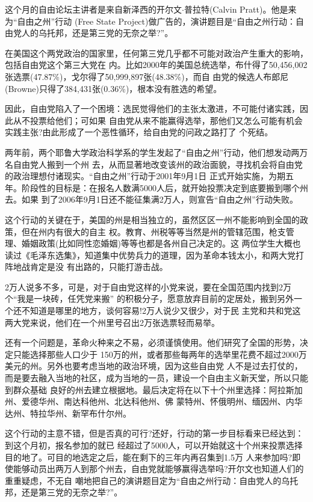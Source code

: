 ﻿\documentclass[11pt]{article}
\begin{document}
这个月的自由论坛主讲者是来自新泽西的开尔文$\cdot$普拉特(Calvin Pratt)。他是来为``自由之州''行动
(Free State Project)做广告的，演讲题目是``自由之州行动：自由党人的乌托邦，还是第三党的无奈之举?''。

在美国这个两党政治的国家里，任何第三党几乎都不可能对政治产生重大的影响，包括自由党这个第三大党在
内。比如2000年的美国总统选举，布什得了50,456,002张选票(47.87\%)，戈尔得了50,999,897张(48.38\%)，而自
由党的候选人布郎尼(Browne)只得了384,431张(0.36\%)，根本没有胜选的希望。

因此，自由党陷入了一个困境：选民觉得他们的主张太激进，不可能付诸实践，因此从不投票给他们；可如果
自由党从来不能赢得选举，那他们又怎么可能有机会实践主张?由此形成了一个恶性循环，给自由党的问政之路打了
个死结。

两年前，两个耶鲁大学政治科学系的学生发起了``自由之州''行动，他们想发动两万名自由党人搬到一个州
去，从而显著地改变该州的政治面貌，寻找机会将自由党的政治理想付诸现实。``自由之州''行动于2001年9月1日
正式开始实施，为期五年。阶段性的目标是：在报名人数满5000人后，就开始投票决定到底要搬到哪个州去。如果
到了2006年9月1日还不能征集满2万人，则宣告``自由之州''行动失败。

这个行动的关键在于，美国的州是相当独立的，虽然区区一州不能影响到全国的政策，但在州内有很大的自主
权。教育、州税等等当然是州的管辖范围，枪支管理、婚姻政策(比如同性恋婚姻)等等也都是各州自己决定的。这
两位学生大概也读过《毛泽东选集》，知道集中优势兵力的道理，因为革命本钱太小，和两大党打阵地战肯定是没
有出路的，只能打游击战。

2万人说多不多，可是，对于自由党这样的小党来说，要在全国范围内找到2万个``我是一块砖，任凭党来搬''
的积极分子，愿意放弃目前的定居处，搬到另外一个还不知道是哪里的地方，谈何容易!2万人说少又很少，对于民
主党和共和党这两大党来说，他们在一个州里号召出2万张选票轻而易举。

还有一个问题是，革命火种来之不易，必须谨慎使用。他们研究了全国的形势，决定只能选择那些人口少于
150万的州，或者那些每两年的选举里花费不超过2000万美元的州。另外也要考虑当地的政治环境，因为这些自由党
人不是过去打仗的，而是要去融入当地的社区，成为当地的一员，建设一个自由主义新天堂，所以只能到群众基础
良好的州去建立根据地。最后决定将在以下十个州里选择：阿拉斯加州、爱德华州、南达科他州、北达科他州、佛
蒙特州、怀俄明州、缅因州、内华达州、特拉华州、新罕布什尔州。

这个行动的主意不错，但是否真的可行?还好，行动的第一步目标看来已经达到：到这个月初，报名参加的就已
经超过了5000人，可以开始就这十个州来投票选择目的地了。可目的地选定之后，能在剩下的三年内再召集到1.5万
人来参加吗?即使能够动员出两万人到那个州去，自由党就能够赢得选举吗?开尔文也知道人们的重重疑虑，不无自
嘲地把自己的演讲题目定为``自由之州行动：自由党人的乌托邦，还是第三党的无奈之举?''。
\end{document}
